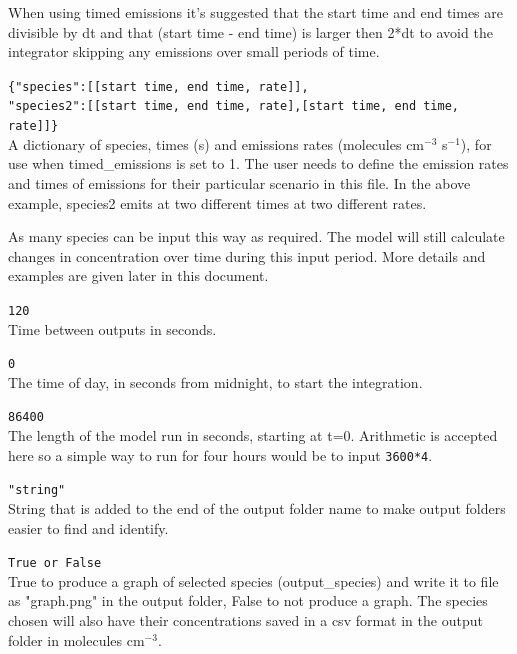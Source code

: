 \documentclass[a4paper]{refart}
\begin{document}
When using timed emissions it's suggested that the start time and end times are divisible by dt
and that (start time - end time) is larger then 2*dt to avoid the integrator skipping any 
emissions over small periods of time.

\texttt{\{"species":[[start time, end time, rate]],\\
          "species2":[[start time, end time, rate],[start time, end time, rate]]\}}\\
A dictionary of species, times (s) and emissions rates  (molecules cm$^{-3}$ s$^{-1}$), for use when timed\_emissions is set to 1. The user needs to define the emission rates and times of emissions for their particular scenario in this file. In the above example, species2 emits at two different times at two different rates.

 As many species can be input this way as required. The model will still calculate changes in concentration over time during this input period. More details and examples are given later in this document.

\texttt{120}\\
Time between outputs in seconds. 

\texttt{0}\\
The time of day, in seconds from midnight, to start the integration. 

\texttt{86400}\\
The length of the model run in seconds, starting at t=0. Arithmetic is accepted here so a simple way to run for four hours would be to input \texttt{3600*4}.

\texttt{"string"}\\
String that is added to the end of the output folder name to make output folders easier to find and identify. 

\texttt{True or False}\\
True to produce a graph of selected species (output\_species) and write it to file as "graph.png" in the output folder, False to not produce a graph. The species chosen will also have their concentrations saved in a csv format in the output folder in molecules cm$^{-3}$.
\end{document}
